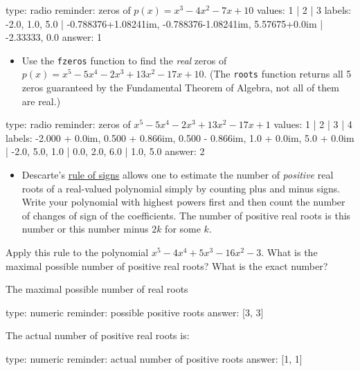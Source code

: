 \documentclass[12pt]{article}
\begin{document}
\begin{answer}
type: radio
reminder: zeros of \(p(x)=x^3 -4x^2 -7x + 10\)
values: 1 | 2 | 3
labels: -2.0, 1.0, 5.0 | -0.788376+1.08241im,  -0.788376-1.08241im, 5.57675+0.0im | -2.33333, 0.0
answer: 1
\end{answer}

\begin{itemize}
\itemsep1pt\parskip0pt
\item
  Use the \texttt{fzeros} function to find the \emph{real} zeros of
  $p(x) = x^5 -5x^4 -2x^3 + 13x^2 -17x + 10$. (The \texttt{roots}
  function returns all 5 zeros guaranteed by the Fundamental Theorem of
  Algebra, not all of them are real.)
\end{itemize}

\begin{answer}
type: radio
reminder: zeros of \( x^5-5x^4 -2x^3 + 13x^2 -17x + 1\)
values: 1 | 2 | 3 | 4
labels: -2.000 + 0.0im, 0.500 + 0.866im, 0.500 - 0.866im, 1.0 + 0.0im, 5.0 + 0.0im | -2.0, 5.0, 1.0 | 0.0, 2.0, 6.0 | 1.0, 5.0
answer: 2
\end{answer}

\begin{itemize}
\itemsep1pt\parskip0pt
\item
  Descarte's
  \href{http://en.wikipedia.org/wiki/Descartes_rule_of_signs}{rule of
  signs} allows one to estimate the number of \emph{positive} real roots
  of a real-valued polynomial simply by counting plus and minus signs.
  Write your polynomial with highest powers first and then count the
  number of changes of sign of the coefficients. The number of positive
  real roots is this number or this number minus $2k$ for some $k$.
\end{itemize}

Apply this rule to the polynomial $x^5 - 4x^4 + 5x^3 - 16x^2 -   3$.
What is the maximal possible number of positive real roots? What is the
exact number?

The maximal possible number of real roots

\begin{answer}
    type: numeric
    reminder: possible positive roots
    answer: [3, 3]

\end{answer}

The actual number of positive real roots is:

\begin{answer}
    type: numeric
    reminder: actual number of positive roots
    answer: [1, 1]

\end{answer}
\end{document}
